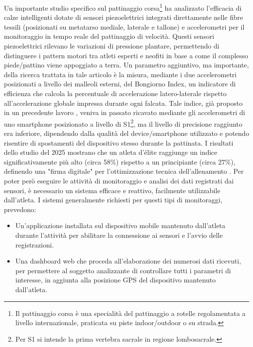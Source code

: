 \documentclass[target=bach,aauheader=,style=]{thud}
\begin{document}
Un importante studio specifico sul pattinaggio corsa\footnote{Il pattinaggio corsa è una specialità del pattinaggio a rotelle regolamentata a livello internazionale, praticata su piste indoor/outdoor o su strada.} ha analizzato l'efficacia di calze intelligenti dotate di sensori
piezoelettrici integrati direttamente nelle fibre tessili (posizionati su metatarso mediale, laterale e
tallone) e accelerometri per il monitoraggio in tempo reale del pattinaggio di velocità. Questi sensori
piezoelettrici rilevano le variazioni di pressione plantare, permettendo di distinguere i pattern motori
tra atleti esperti e neofiti in base a come il complesso piede/pattino viene appoggiato a terra. Un
parametro aggiuntivo, ma importante, della ricerca trattata in tale articolo è la misura, mediante i due
accelerometri posizionati a livello dei malleoli esterni, del Bongiorno Index, un indicatore di
efficienza che calcola la percentuale di accelerazione latero-laterale rispetto all'accelerazione globale
impressa durante ogni falcata. Tale indice, già proposto in un precedente lavoro \cite{articlebongiorno1}, veniva in passato
ricavato mediante gli accelerometri di uno smartphone posizionato a livello di S1\footnote{Per S1 si intende la prima vertebra sacrale in regione lombosacrale.}, ma il livello di
precisione raggiunto era inferiore, dipendendo dalla qualità del device/smartphone utilizzato e
potendo risentire di spostamenti del dispositivo stesso durante la pattinata. I risultati dello studio del
2025 mostrano che un atleta d'élite raggiunge un indice significativamente più alto (circa 58\%)
rispetto a un principiante (circa 27\%), definendo una "firma digitale" per l'ottimizzazione tecnica
dell'allenamento \cite{articlebongiorno2}.
Per poter però eseguire le attività di monitoraggio e analisi dei dati registrati dai sensori, è necessario un sistema efficace e reattivo, facilmente utilizzabile dall'atleta. I sistemi generalmente richiesti per questi tipi di monitoraggi, prevedono:

\begin{itemize}
   \item Un'applicazione installata sul dispositivo mobile mantenuto dall'atleta durante l'attività per abilitare la connessione ai sensori e l'avvio delle registrazioni.
   \item Una dashboard web che proceda all'elaborazione dei numerosi dati ricevuti, per permettere al soggetto analizzante di controllare tutti i parametri di interesse, in aggiunta alla posizione GPS del dispositivo mantenuto dall'atleta.
\end{itemize}
\end{document}
